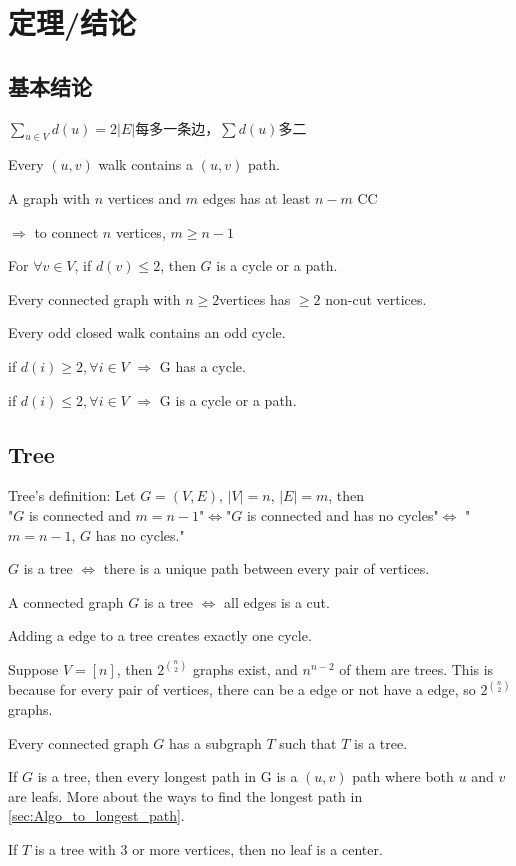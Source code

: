\documentclass[12pt,a4paper]{ctexrep}
\begin{document}
\section{定理/结论}
\subsection{基本结论}
$\sum_{u \in V} d(u) = 2|E|$每多一条边，$\sum d(u)$多二

Every $(u,v)$ walk contains a $(u,v)$ path.

A graph with $n$ vertices and $m$ edges has at least $n-m$ CC

$\Rightarrow$ to connect $n$ vertices, $m \geq n-1$

For $\forall v \in V$, if $d(v)\leq 2$, then $G$ is a cycle or a path.

Every connected graph with $n \geq 2$vertices has $\geq 2$ non-cut vertices.

Every odd closed walk contains an odd cycle.

if $d(i) \geq 2, \forall i \in V$ $\Rightarrow$ G has a cycle.

if $d(i) \leq 2, \forall i \in V$ $\Rightarrow$ G is a cycle or a path.
\subsection{Tree}
Tree's definition: Let $G=(V,E)$, $|V|=n$, $|E|=m$, then \\
"$G$ is connected and $m=n-1$"$\iff$"$G$ is connected and has no cycles"$\iff$ "$m = n-1$, $G$ has no cycles."

$G$ is a tree $\iff$ there is a unique path between every pair of vertices.

A connected graph $G$ is a tree $\iff$ all edges is a cut.

Adding a edge to a tree creates exactly one cycle.

Suppose $V=[n]$, then $2^{\binom{n}{2}}$ graphs exist, and $n^{n-2}$ of them are trees. This is because for every pair of vertices, there can be a edge or not have a edge, so $2^{\binom{n}{2}}$ graphs.

Every connected graph $G$ has a subgraph $T$ such that $T$ is a tree.

If $G$ is a tree, then every longest path in G is a $(u,v)$ path where both $u$ and $v$ are leafs. More about the ways to find the longest path in \ref{sec:Algo_to_longest_path}.

If $T$ is a tree with 3 or more vertices, then no leaf is a center.
\end{document}
